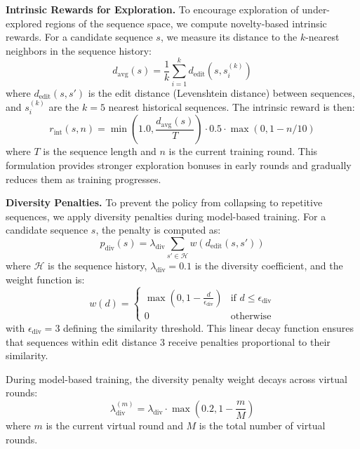 \textbf{Intrinsic Rewards for Exploration.} To encourage exploration of under-explored regions of the sequence space, we compute novelty-based intrinsic rewards. For a candidate sequence $s$, we measure its distance to the $k$-nearest neighbors in the sequence history:
%
\begin{equation}
d_{\text{avg}}(s) = \frac{1}{k}\sum_{i=1}^{k} d_{\text{edit}}(s, s_i^{(k)})
\end{equation}
%
where $d_{\text{edit}}(s, s')$ is the edit distance (Levenshtein distance) between sequences, and $s_i^{(k)}$ are the $k=5$ nearest historical sequences. The intrinsic reward is then:
%
\begin{equation}
r_{\text{int}}(s, n) = \min\left(1.0, \frac{d_{\text{avg}}(s)}{T}\right) \cdot 0.5 \cdot \max(0, 1 - n/10)
\end{equation}
%
where $T$ is the sequence length and $n$ is the current training round. This formulation provides stronger exploration bonuses in early rounds and gradually reduces them as training progresses.

\textbf{Diversity Penalties.} To prevent the policy from collapsing to repetitive sequences, we apply diversity penalties during model-based training. For a candidate sequence $s$, the penalty is computed as:
%
\begin{equation}
p_{\text{div}}(s) = \lambda_{\text{div}} \sum_{s' \in \mathcal{H}} w(d_{\text{edit}}(s, s'))
\end{equation}
%
where $\mathcal{H}$ is the sequence history, $\lambda_{\text{div}} = 0.1$ is the diversity coefficient, and the weight function is:
%
\begin{equation}
w(d) = \begin{cases}
\max\left(0, 1 - \frac{d}{\epsilon_{\text{div}}}\right) & \text{if } d \leq \epsilon_{\text{div}} \\
0 & \text{otherwise}
\end{cases}
\end{equation}
%
with $\epsilon_{\text{div}} = 3$ defining the similarity threshold. This linear decay function ensures that sequences within edit distance 3 receive penalties proportional to their similarity.

During model-based training, the diversity penalty weight decays across virtual rounds:
%
\begin{equation}
\lambda_{\text{div}}^{(m)} = \lambda_{\text{div}} \cdot \max\left(0.2, 1 - \frac{m}{M}\right)
\end{equation}
%
where $m$ is the current virtual round and $M$ is the total number of virtual rounds.

